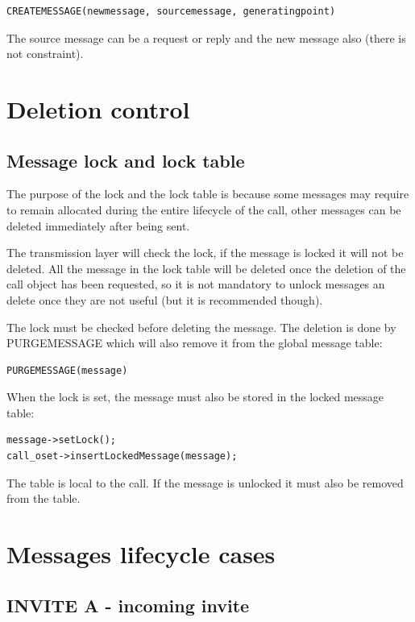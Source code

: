 \documentclass[a4paper]{article}
\begin{document}
\begin{verbatim}
CREATEMESSAGE(newmessage, sourcemessage, generatingpoint)
\end{verbatim}

The source message can be a request or reply and the new message also (there is not constraint).

\section{Deletion control}

\subsection{Message lock and lock table}

The purpose of the lock and the lock table is because some messages may require to remain allocated during the entire lifecycle of the call,
other messages can be deleted immediately after being sent.

The transmission layer will check the lock, if the message is locked it will not be deleted. 
All the message in the lock table will be deleted once the deletion of the call object has been requested, so it is not mandatory to unlock messages an delete once they are not useful
(but it is recommended though).

The lock must be checked before deleting the message. The deletion is done by PURGEMESSAGE which will also remove it from the global message table:
\begin{verbatim}
PURGEMESSAGE(message)
\end{verbatim}

When the lock is set, the message must also be stored in the locked message table:
\begin{verbatim}
message->setLock();
call_oset->insertLockedMessage(message);
\end{verbatim}
The table is local to the call. If the message is unlocked it must also be removed from the table.

\section{Messages lifecycle cases}

\subsection{INVITE A - incoming invite}
\end{document}
